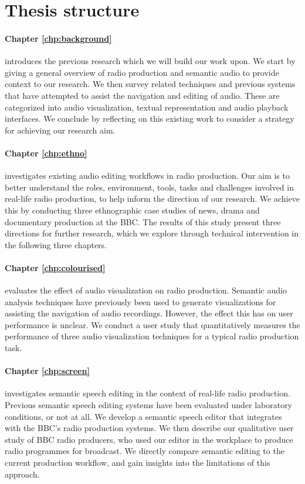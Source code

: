 \section{Thesis structure}\label{sec:intro/structure}

\paragraph{Chapter \ref{chp:background}} introduces the previous research which we will build our work upon. We start
by giving a general overview of radio production and semantic audio to provide context to our research. We then survey
related techniques and previous systems that have attempted to assist the navigation and editing of audio. These are
categorized into audio visualization, textual representation and audio playback interfaces. We conclude by reflecting
on this existing work to consider a strategy for achieving our research aim.

\paragraph{Chapter \ref{chp:ethno}} investigates existing audio editing workflows in radio production. Our aim is to
better understand the roles, environment, tools, tasks and challenges involved in real-life radio production, to help
inform the direction of our research.  We achieve this by conducting three ethnographic case studies of news, drama and
documentary production at the BBC. The results of this study present three directions for further research, which we
explore through technical intervention in the following three chapters.

\paragraph{Chapter \ref{chp:colourised}} evaluates the effect of audio visualization on radio production.  Semantic
audio analysis techniques have previously been used to generate visualizations for assisting the navigation of audio
recordings. However, the effect this has on user performance is unclear.  We conduct a user study that quantitatively
measures the performance of three audio visualization techniques for a typical radio production task.

\paragraph{Chapter \ref{chp:screen}} investigates semantic speech editing in the context of real-life radio production.
Previous semantic speech editing systems have been evaluated under laboratory conditions, or not at all.  We develop a 
semantic speech editor that integrates with the BBC's radio production systems.  We then describe our qualitative
user study of BBC radio producers, who used our editor in the workplace to produce radio programmes for broadcast.  We
directly compare semantic editing to the current production workflow, and gain insights into the limitations of this
approach.

